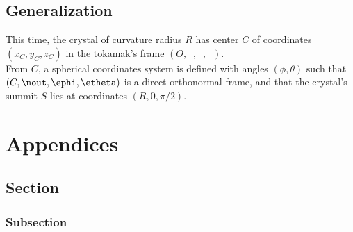 \documentclass[a4paper,11pt,twoside,titlepage,openright]{book}
\numberwithin{equation}{section}
\DeclareMathOperator{\ex}{\underline{e}_x}
\DeclareMathOperator{\ey}{\underline{e}_y}
\DeclareMathOperator{\ez}{\underline{e}_z}
\begin{document}
\section{Generalization}

This time, the crystal of curvature radius $R$ has center $C$ of coordinates $(x_C, y_C, z_C)$ in the tokamak's frame $(O, \ex, \ey, \ez)$.\\
From $C$, a spherical coordinates system is defined with angles $(\phi, \theta)$ such that $(C, \nout, \ephi, \etheta)$ is a direct orthonormal frame, and that the crystal's summit $S$ lies at coordinates $(R, 0, \pi/2)$.








\appendix
\chapter{Appendices}

\section{Section}
\subsection{Subsection}
\end{document}
